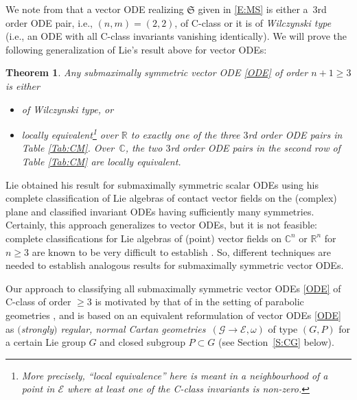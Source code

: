 \documentclass[10pt,a4paper]{amsart}
\newcommand\cG{\mathcal{G}}
\newcommand\fS{\mathfrak{S}}
\newcommand{\R}{\mathbb{R}}
\newcommand{\C}{\mathbb{C}}
\newcommand\cE{\mathcal{E}}
\numberwithin{equation}{section}
\newtheorem{Theorem}{Theorem}[section]
\begin{document}
We note from \cite[Tables 8 and~10]{KT2021} that a vector ODE realizing $\fS$ given in \eqref{E:MS} is either a~3rd order ODE pair, i.e., $(n,m) = (2,2)$, of C-class or it is of {\em Wilczynski type} (i.e., an ODE with all C-class invariants vanishing identically). We will prove the following generalization of Lie's result above for vector ODEs:

\begin{Theorem} \label{T:I}
Any submaximally symmetric vector ODE \eqref{ODE} of order $n+1 \ge 3$ is either
\begin{itemize}\itemsep=0pt
\item[$(a)$] of Wilczynski type, or
\item[$(b)$] locally equivalent\footnote{More precisely, ``local equivalence'' here is meant in a neighbourhood of a point in $\cE$ where at least one of the C-class invariants is non-zero.} over $\R$ to exactly one of the three $3$rd order ODE pairs in Table {\rm \ref{Tab:CM}}. Over~$\C$, the two $3$rd order ODE pairs in the second row of Table {\rm \ref{Tab:CM}} are locally equivalent.
\end{itemize}
\end{Theorem}

Lie obtained his result for submaximally symmetric scalar ODEs using his complete classification of Lie algebras of contact vector fields on the (complex) plane and classified invariant ODEs having sufficiently many symmetries. Certainly, this approach generalizes to vector ODEs, but it is not feasible: complete classifications for Lie algebras of (point) vector fields on $\C^n$ or $\R^n$ for $n \ge 3$ are known to be very difficult to establish \cite{Doubrov2017,Schneider2018}. So, different techniques are needed to establish analogous results for submaximally symmetric vector ODEs.

Our approach to classifying all submaximally symmetric vector ODEs \eqref{ODE} of C-class of order $\ge 3$ is motivated by that of \cite{The2021, The2022} in the setting of parabolic geometries \cite{CS2009}, and is based on an equivalent reformulation of vector ODEs \eqref{ODE} as {\em $($strongly$)$ regular, normal Cartan ge\-ome\-tries}~$(\cG \to \cE, \omega)$ of type $(G,P)$ for a certain Lie group $G$ and closed subgroup $P \subset G$ \cite{CDT2020,Doubrov2001,DKM1999} (see Section~\ref{S:CG} below).
\end{document}
